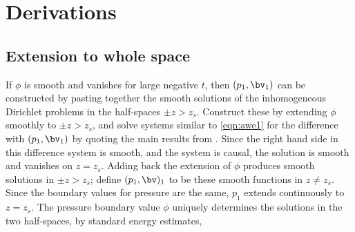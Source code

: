 \section{Derivations}
\subsection{Extension to whole space}
If $\phi$ is smooth and vanishes for large negative $t$, then
$(p_1,\bv_1)$ can be constructed by pasting together the smooth
solutions of the inhomogeneous Dirichlet problems in the half-spaces
$\pm z > z_s$. Construct these by extending $\phi$ smoothly to
$\pm z>z_s$, and solve systems similar to \ref{eqn:awe1} for the
difference with $(p_1,\bv_1)$ by quoting the main results from
\cite{BlazekStolkSymes:13}. Since the right hand side in this
difference system is smooth, and the system is causal, the solution is
smooth and vanishes on $z=z_s$. Adding back the extension of $\phi$
produces smooth solutions in $\pm z > z_s$; define $(p_1,\bv)_1$ to be
these smooth functions in $z \ne z_s$. Since the boundary values for
pressure are the same, $p_1$ extends continuously to $z=z_s$. 
The pressure boundary value $\phi$ uniquely determines the solutions
in the two half-spaces, by standard energy estimates,


